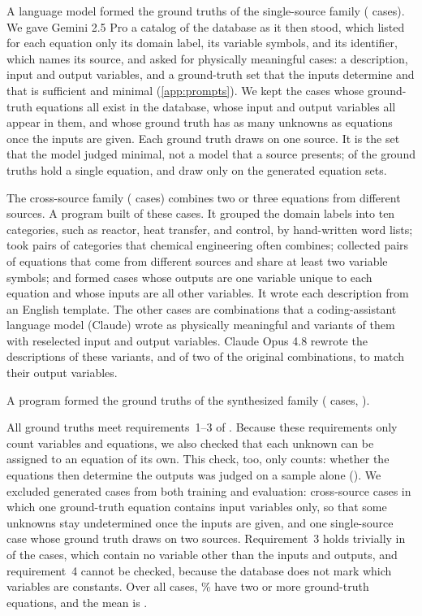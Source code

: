 A language model formed the ground truths of the single-source family (\NSingle{} cases). We gave
Gemini 2.5 Pro a catalog of the database as it then stood, which listed for each equation only
its domain label, its variable symbols, and its identifier, which names its source, and asked for
physically meaningful cases: a description, input and output
variables, and a ground-truth set that the inputs determine and that is sufficient and minimal
(\ref{app:prompts}). We kept the cases whose ground-truth equations all exist in the database, whose
input and output variables all appear in them, and whose ground truth has as many unknowns as
equations once the inputs are given. Each ground truth draws on one source. It is the set that the
model judged minimal, not a model that a source presents; \NSingleOneEq{} of the \NSingle{} ground
truths hold a single equation, and \NSingleRefOnly{} draw only on the generated equation sets.

The cross-source family (\NCross{} cases) combines two or three equations from different sources. A
program built \NCrossProgram{} of these cases. It grouped the domain labels into ten categories,
such as reactor, heat transfer, and control, by hand-written word lists; took pairs of categories
that chemical engineering often combines; collected pairs of equations that come from different
sources and share at least two variable symbols; and formed cases whose outputs are one variable
unique to each equation and whose inputs are all other variables. It wrote each description from an
English template. The other cases are \NCrossPicked{} combinations that a coding-assistant language
model (Claude) wrote as physically meaningful and \NCrossReselected{} variants of them with
reselected input and output variables. Claude Opus 4.8 \citep{ClaudeOpus48} rewrote the descriptions
of these variants, and of two of the original combinations, to match their output variables.

A program formed the ground truths of the synthesized family (\NSynth{} cases,
).

All ground truths meet requirements~1--3 of . Because these
requirements only count variables and equations, we also checked that each unknown can be assigned
to an equation of its own. This check, too, only counts: whether the equations then determine the
outputs was judged on a sample alone (). We excluded \NExcluded{} generated cases from both training and
evaluation: \NExcludedCross{} cross-source cases in which one ground-truth equation contains input
variables only, so that some unknowns stay undetermined once the inputs are given, and one
single-source case whose ground truth draws on two sources. Requirement~3 holds trivially in
\NReqThreeTrivial{} of the \NCases{} cases, which contain no variable other than the inputs and
outputs, and requirement~4 cannot be checked, because the database does not mark which variables are
constants. Over all cases, \ShareKTwoPlus\% have two or more ground-truth equations, and the mean is
\MeanKAll.

